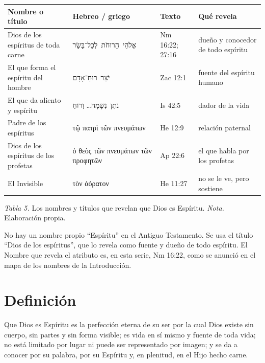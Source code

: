 \documentclass[11pt,letterpaper]{article}
\newcommand{\heb}[1]{\mbox{\foreignlanguage{hebrew}{#1}}}
\newcommand{\grc}[1]{\foreignlanguage{ancientgreek}{#1}}
\begin{document}
\begin{center}\small\renewcommand{\arraystretch}{1.22}
\begin{tabular}{@{}L{4.3cm}L{4.6cm}L{2.0cm}L{3.4cm}@{}}
\toprule
\textbf{Nombre o título} & \textbf{Hebreo / griego} & \textbf{Texto} & \textbf{Qué revela} \\ \midrule
Dios de los espíritus de toda carne & \heb{אֱלֹהֵי הָרוּחֹת לְכָל־בָּשָׂר} & Nm 16:22; 27:16 & dueño y conocedor de todo espíritu \\
El que forma el espíritu del hombre & \heb{יֹצֵר רוּחַ־אָדָם} & Zac 12:1 & fuente del espíritu humano \\
El que da aliento y espíritu & \heb{נֹתֵן נְשָׁמָה}\ldots{} \heb{וְרוּחַ} & Is 42:5 & dador de la vida \\
Padre de los espíritus & \grc{τῷ πατρὶ τῶν πνευμάτων} & He 12:9 & relación paternal \\
Dios de los espíritus de los profetas & \grc{ὁ θεὸς τῶν πνευμάτων τῶν προφητῶν} & Ap 22:6 & el que habla por los profetas \\
El Invisible & \grc{τὸν ἀόρατον} & He 11:27 & no se le ve, pero sostiene \\
\bottomrule
\end{tabular}\par
{\footnotesize\color{gris}\textit{Tabla 5.} Los nombres y títulos que revelan que Dios es Espíritu. \textit{Nota.} Elaboración propia.}
\end{center}

\begin{nota}[Precisión]
No hay un nombre propio ``Espíritu'' en el Antiguo Testamento. Se usa el título ``Dios de los espíritus'', que lo revela como fuente y dueño de todo espíritu. El Nombre que revela el atributo es, en esta serie, Nm 16:22, como se anunció en el mapa de los nombres de la Introducción.
\end{nota}

\section{Definición}

\begin{tcolorbox}[colback=papiro,colframe=azul,boxrule=1pt,arc=3pt,title={Definición},colbacktitle=azul,coltitle=papiro]
Que Dios es Espíritu es la perfección eterna de su ser por la cual Dios existe sin cuerpo, sin partes y sin forma visible; es vida en sí mismo y fuente de toda vida; no está limitado por lugar ni puede ser representado por imagen; y se da a conocer por su palabra, por su Espíritu y, en plenitud, en el Hijo hecho carne.
\end{tcolorbox}
\end{document}
